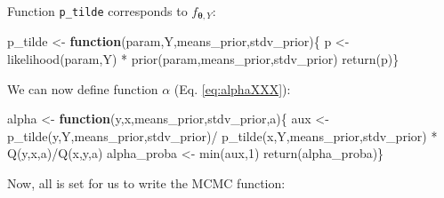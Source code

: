 \documentclass[
  12pt,
]{book}
\newenvironment{Shaded}{\begin{snugshade}}{\end{snugshade}}
\newcommand{\ControlFlowTok}[1]{\textcolor[rgb]{0.13,0.29,0.53}{\textbf{#1}}}
\newcommand{\DecValTok}[1]{\textcolor[rgb]{0.00,0.00,0.81}{#1}}
\newcommand{\FunctionTok}[1]{\textcolor[rgb]{0.00,0.00,0.00}{#1}}
\newcommand{\NormalTok}[1]{#1}
\newcommand{\OtherTok}[1]{\textcolor[rgb]{0.56,0.35,0.01}{#1}}
\newcommand{\SpecialCharTok}[1]{\textcolor[rgb]{0.00,0.00,0.00}{#1}}
\theoremstyle{definition}
\theoremstyle{definition}
\theoremstyle{definition}
\theoremstyle{definition}
\theoremstyle{remark}
\begin{document}
Function \texttt{p\_tilde} corresponds to \(f_{{\boldsymbol\theta},Y}\):

\begin{Shaded}
\begin{Highlighting}[]
\NormalTok{p\_tilde }\OtherTok{\textless{}{-}} \ControlFlowTok{function}\NormalTok{(param,Y,means\_prior,stdv\_prior)\{}
\NormalTok{  p }\OtherTok{\textless{}{-}} \FunctionTok{likelihood}\NormalTok{(param,Y) }\SpecialCharTok{*} \FunctionTok{prior}\NormalTok{(param,means\_prior,stdv\_prior)}
  \FunctionTok{return}\NormalTok{(p)\}}
\end{Highlighting}
\end{Shaded}

We can now define function \(\alpha\) (Eq. \eqref{eq:alphaXXX}):

\begin{Shaded}
\begin{Highlighting}[]
\NormalTok{alpha }\OtherTok{\textless{}{-}} \ControlFlowTok{function}\NormalTok{(y,x,means\_prior,stdv\_prior,a)\{}
\NormalTok{  aux }\OtherTok{\textless{}{-}} \FunctionTok{p\_tilde}\NormalTok{(y,Y,means\_prior,stdv\_prior)}\SpecialCharTok{/}
    \FunctionTok{p\_tilde}\NormalTok{(x,Y,means\_prior,stdv\_prior) }\SpecialCharTok{*} \FunctionTok{Q}\NormalTok{(y,x,a)}\SpecialCharTok{/}\FunctionTok{Q}\NormalTok{(x,y,a)}
\NormalTok{  alpha\_proba }\OtherTok{\textless{}{-}} \FunctionTok{min}\NormalTok{(aux,}\DecValTok{1}\NormalTok{)}
  \FunctionTok{return}\NormalTok{(alpha\_proba)\}}
\end{Highlighting}
\end{Shaded}

Now, all is set for us to write the MCMC function:
\end{document}
